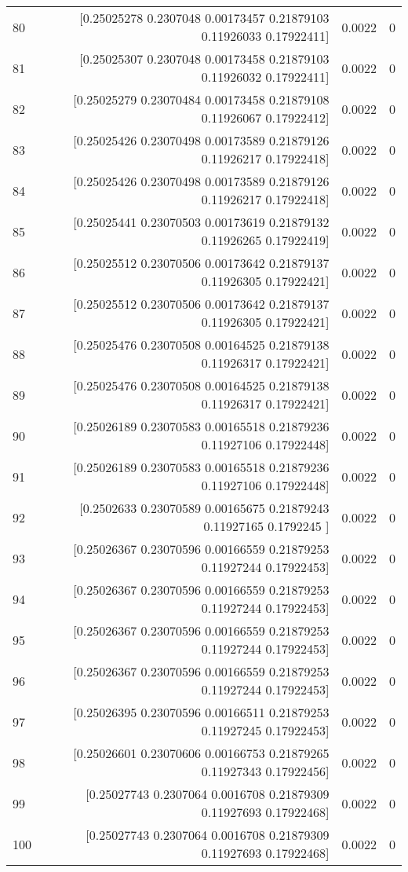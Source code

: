 \begin{longtable}{lrrr}
80 & [0.25025278 0.2307048  0.00173457 0.21879103 0.11926033 0.17922411] & 0.0022 & 0 \\
81 & [0.25025307 0.2307048  0.00173458 0.21879103 0.11926032 0.17922411] & 0.0022 & 0 \\
82 & [0.25025279 0.23070484 0.00173458 0.21879108 0.11926067 0.17922412] & 0.0022 & 0 \\
83 & [0.25025426 0.23070498 0.00173589 0.21879126 0.11926217 0.17922418] & 0.0022 & 0 \\
84 & [0.25025426 0.23070498 0.00173589 0.21879126 0.11926217 0.17922418] & 0.0022 & 0 \\
85 & [0.25025441 0.23070503 0.00173619 0.21879132 0.11926265 0.17922419] & 0.0022 & 0 \\
86 & [0.25025512 0.23070506 0.00173642 0.21879137 0.11926305 0.17922421] & 0.0022 & 0 \\
87 & [0.25025512 0.23070506 0.00173642 0.21879137 0.11926305 0.17922421] & 0.0022 & 0 \\
88 & [0.25025476 0.23070508 0.00164525 0.21879138 0.11926317 0.17922421] & 0.0022 & 0 \\
89 & [0.25025476 0.23070508 0.00164525 0.21879138 0.11926317 0.17922421] & 0.0022 & 0 \\
90 & [0.25026189 0.23070583 0.00165518 0.21879236 0.11927106 0.17922448] & 0.0022 & 0 \\
91 & [0.25026189 0.23070583 0.00165518 0.21879236 0.11927106 0.17922448] & 0.0022 & 0 \\
92 & [0.2502633  0.23070589 0.00165675 0.21879243 0.11927165 0.1792245 ] & 0.0022 & 0 \\
93 & [0.25026367 0.23070596 0.00166559 0.21879253 0.11927244 0.17922453] & 0.0022 & 0 \\
94 & [0.25026367 0.23070596 0.00166559 0.21879253 0.11927244 0.17922453] & 0.0022 & 0 \\
95 & [0.25026367 0.23070596 0.00166559 0.21879253 0.11927244 0.17922453] & 0.0022 & 0 \\
96 & [0.25026367 0.23070596 0.00166559 0.21879253 0.11927244 0.17922453] & 0.0022 & 0 \\
97 & [0.25026395 0.23070596 0.00166511 0.21879253 0.11927245 0.17922453] & 0.0022 & 0 \\
98 & [0.25026601 0.23070606 0.00166753 0.21879265 0.11927343 0.17922456] & 0.0022 & 0 \\
99 & [0.25027743 0.2307064  0.0016708  0.21879309 0.11927693 0.17922468] & 0.0022 & 0 \\
100 & [0.25027743 0.2307064  0.0016708  0.21879309 0.11927693 0.17922468] & 0.0022 & 0 \\

\end{longtable}
